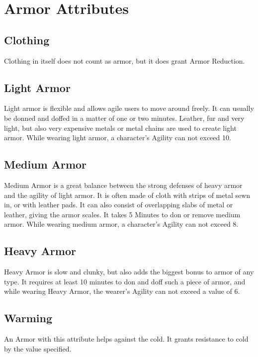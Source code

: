 \section{Armor Attributes}\label{sec:armorAttributes}

\subsection{Clothing}\label{subsec:clothing}
Clothing in itself does not count as armor, but it does grant Armor Reduction.

\subsection{Light Armor}\label{subsec:lightArmor}
Light armor is flexible and allows agile users to move around freely.
It can usually be donned and doffed in a matter of one or two minutes.
Leather, fur and very light, but also very expensive metals or metal chains are used to create light armor.
While wearing light armor, a character's Agility can not exceed 10.

\subsection{Medium Armor}\label{subsec:mediumArmor}
Medium Armor is a great balance between the strong defenses of heavy armor and the agility of light armor.
It is often made of cloth with strips of metal sewn in, or with leather pads.
It can also consist of overlapping slabs of metal or leather, giving the armor scales.
It takes 5 Minutes to don or remove medium armor.
While wearing medium armor, a character's Agility can not exceed 8.

\subsection{Heavy Armor}\label{subsec:heavyArmor}
Heavy Armor is slow and clunky, but also adds the biggest bonus to armor of any type.
It requires at least 10 minutes to don and doff such a piece of armor, and while wearing Heavy Armor, the wearer's Agility can not exceed a value of 6.

\subsection{Warming}\label{armor:warming}
An Armor with this attribute helps against the cold.
It grants resistance to cold by the value specified.

